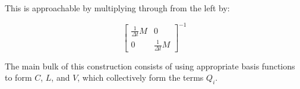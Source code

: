 \documentclass[12pt,a4paper,pagesize=pdftex]{scrartcl}
\begin{document}
This is approachable by multiplying through from the left by:

\begin{equation*}
    \begin{bmatrix}
        \frac{1}{\Delta t}M & 0 \\
        0 & \frac{1}{\Delta t} M
    \end{bmatrix}^{-1}
\end{equation*}

The main bulk of this construction consists of using appropriate basis functions to form \(C\), \(L\), and \(V\), which collectively form the terms \(Q_i\).
\end{document}
